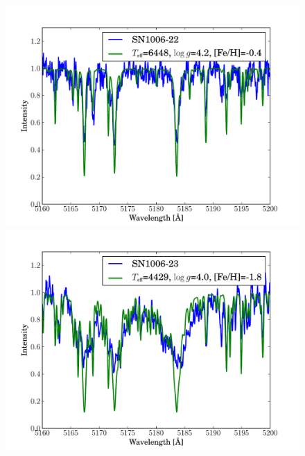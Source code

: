 \begin{figure}[tb]
   \label{fig:sn1006_candfit}
\end{figure}\begin{figure}[tb] %
   \centering
\includegraphics[width=1.1\textwidth, trim=0 0mm 0 10mm, clip]{chapter_sn1006/plots/gold_spectra/sn1006_22.pdf}
\includegraphics[width=1.1\textwidth, trim=0 0mm 0 10mm, clip]{chapter_sn1006/plots/gold_spectra/sn1006_23.pdf}


\end{figure}
